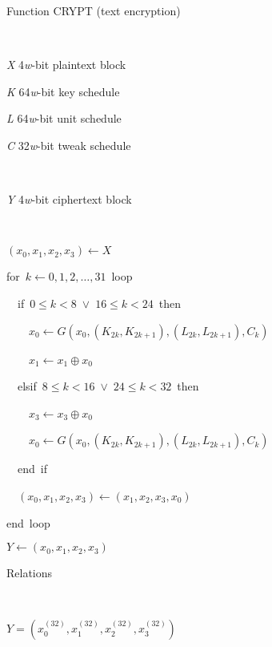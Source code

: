 \documentclass[a4paper,oneside,english]{amsart}
\numberwithin{equation}{section}
\numberwithin{figure}{section}
\newenvironment{lyxlist}[1]
{\begin{list}{}
{\settowidth{\labelwidth}{#1}
 \setlength{\leftmargin}{\labelwidth}
 \addtolength{\leftmargin}{\labelsep}
 \renewcommand{\makelabel}[1]{##1\hfil}}}
{\end{list}}
\newenvironment{lyxcode}
{\par\begin{list}{}{
\setlength{\rightmargin}{\leftmargin}
\setlength{\listparindent}{0pt}\raggedright
\setlength{\itemsep}{0pt}
\setlength{\parsep}{0pt}
\normalfont\ttfamily}\item[]}
{\end{list}}
\begin{document}
\begin{algorithm}
\caption{\label{alg:Function-CRYPT}Function CRYPT (text encryption)}

\begin{description}
\item [{Input}]~

\begin{lyxlist}{00.00.0000}
\item [{\emph{X}}] 4\emph{w}-bit plaintext block
\item [{\emph{K}}] 64\emph{w}-bit key schedule
\item [{\emph{L}}] 64\emph{w}-bit unit schedule
\item [{\emph{C}}] 32\emph{w}-bit tweak schedule
\end{lyxlist}
\item [{Output}]~

\begin{lyxlist}{00.00.0000}
\item [{\emph{Y}}] 4\emph{w}-bit ciphertext block
\end{lyxlist}
\item [{Pseudo-code}]~\end{description}
\begin{lyxcode}
\textrm{$(x_{0},x_{1},x_{2},x_{3})\leftarrow X$}

for~$k\leftarrow0,1,2,\ldots,31$~loop

~~if~$0\leqslant k<8\;\vee\;16\leqslant k<24$~then

~~~~$x_{0}\leftarrow G(x_{0},(K_{2k},K_{2k+1}),(L_{2k},L_{2k+1}),C_{k})$

~~~~$x_{1}\leftarrow x_{1}\oplus x_{0}$~

~~elsif~$8\leqslant k<16\;\vee\;24\leqslant k<32$~then

~~~~$x_{3}\leftarrow x_{3}\oplus x_{0}$

~~~~$x_{0}\leftarrow G(x_{0},(K_{2k},K_{2k+1}),(L_{2k},L_{2k+1}),C_{k})$

~~end~if

~~\textrm{$(x_{0},x_{1},x_{2},x_{3})\leftarrow(x_{1},x_{2},x_{3},x_{0})$}

end~loop

\textrm{$Y\leftarrow(x_{0},x_{1},x_{2},x_{3})$}\end{lyxcode}
\begin{description}
\item [{Relations}]~\end{description}
\begin{lyxcode}
$Y=(x_{0}^{(32)},x_{1}^{(32)},x_{2}^{(32)},x_{3}^{(32)})$


\end{lyxcode}
\end{algorithm}
\end{document}
